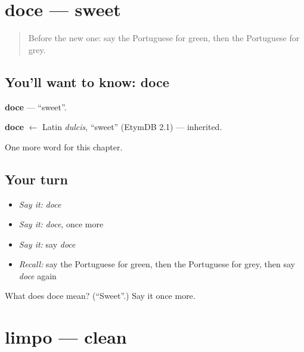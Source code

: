 \section[doce]{doce — sweet}

\label{lesson:PT-C69-doce}



\begin{quote}
Before the new one: say the Portuguese for green, then the Portuguese for grey.
\end{quote}

\subsection*{You'll want to know: doce}
\textbf{doce} — \textquotedblleft{}sweet\textquotedblright{}.

\begin{cousinweb}
\textbf{doce} $\leftarrow$ Latin \emph{dulcis}, \textquotedblleft{}sweet\textquotedblright{} (EtymDB 2.1) — inherited.
\end{cousinweb}

\begin{grammarlens}[title={What you've built}]
One more word for this chapter.
\end{grammarlens}

\subsection*{Your turn}
\begin{itemize}
\raggedright
  \item \emph{Say it:} \emph{doce}
  \item \emph{Say it:} \emph{doce}, once more
  \item \emph{Say it:} say \emph{doce}
  \item \emph{Recall:} say the Portuguese for green, then the Portuguese for grey, then say \emph{doce} again
\end{itemize}

\begin{tcolorbox}[breakable,colback=teal!4,colframe=teal!35!black,title={Before you move on}]
What does doce mean? (\textquotedblleft{}Sweet\textquotedblright{}.) Say it once more.
\end{tcolorbox}
\section[limpo]{limpo — clean}

